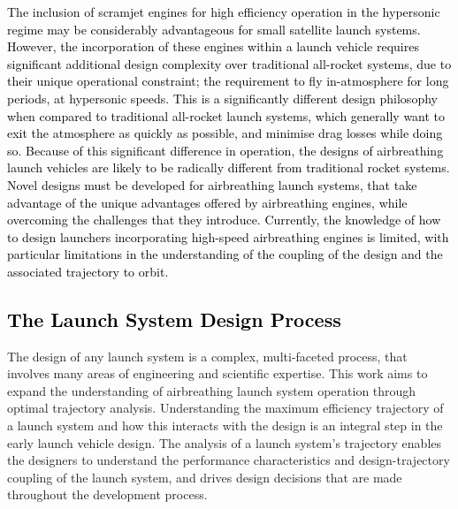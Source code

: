     \textcolor{black}{The inclusion of scramjet engines for high efficiency operation in the hypersonic regime may be considerably advantageous for small satellite launch systems. However, the incorporation of these engines within a launch vehicle requires significant additional design complexity over traditional all-rocket systems, due to their unique operational constraint; the requirement to fly in-atmosphere for long periods, at hypersonic speeds.
    This is a significantly different design philosophy when compared to traditional all-rocket launch systems, which generally want to exit the atmosphere as quickly as possible, and minimise drag losses while doing so. Because of this significant difference in operation, the designs of airbreathing launch vehicles are likely to be radically different from traditional rocket systems. Novel designs must be developed for airbreathing launch systems, that take advantage of the unique advantages offered by airbreathing engines, while overcoming the challenges that they introduce. 
    Currently, the knowledge of how to design launchers incorporating high-speed airbreathing engines is limited, with particular limitations in the understanding of the coupling of the design and the associated trajectory to orbit. 
    	}
    
    
    
    
    
    \textcolor{black}{
    	\section{The Launch System Design Process}
    }
    \noindent
    The design of any launch system is a complex, multi-faceted process, that involves many areas of engineering and scientific expertise. This work aims to expand the understanding of airbreathing launch system operation through optimal trajectory analysis. Understanding the maximum efficiency trajectory of a launch system and how this interacts with the design is an integral step in the early launch vehicle design. The analysis of a launch system's trajectory enables the designers to understand the performance characteristics and design-trajectory coupling of the launch system, and drives design decisions that are made throughout the development process. 
    
